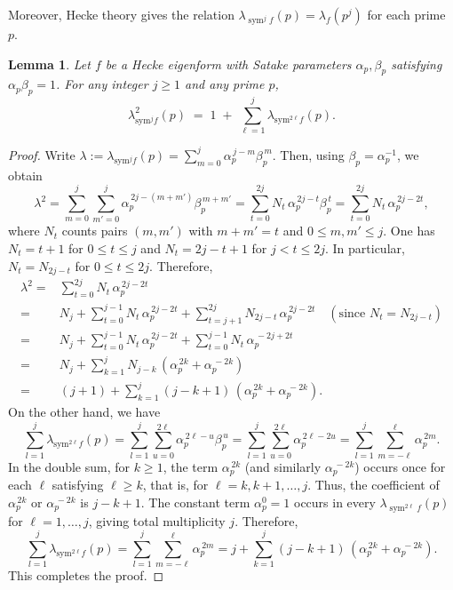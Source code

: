 \documentclass[10pt]{amsart}
\newtheorem{lemma}[theorem]{Lemma}
\begin{document}
Moreover, Hecke theory gives the relation $\lambda_{\operatorname{sym}^{j}f}(p) = \lambda_f(p^{j}) $ for each prime $p$.
\begin{lemma}\label{lambdasquare}
Let $f$ be a Hecke eigenform with Satake parameters $\alpha_p,\beta_p$ satisfying $\alpha_p\beta_p=1$.
For any integer $j \ge 1$ and any prime $p$,
\[
\lambda_{\mathrm{sym}^{j}f}^{2}(p) \;=\; 1 \;+\; \sum_{\ell=1}^{j} \lambda_{\mathrm{sym}^{2\ell}f}(p).\]
\end{lemma}
\begin{proof}
Write $\lambda := \lambda_{\mathrm{sym}^{j}f}(p) = \sum_{m=0}^{j} \alpha_p^{\,j-m}\beta_p^{\,m}$.
Then, using $\beta_p = \alpha_p^{-1}$, we obtain
\[
\lambda^{2} = \sum_{m=0}^{j}\sum_{m'=0}^{j} \alpha_p^{\,2j-(m+m')}\beta_p^{\,m+m'}
      = \sum_{t=0}^{2j} N_t \, \alpha_p^{\,2j-t}\beta_p^{\,t}= \sum_{t=0}^{2j} N_t \, \alpha_p^{\,2j-2t},
\]
where $N_t$ counts pairs $(m,m')$ with $m+m'=t$ and $0\le m,m'\le j$.
One has $N_t = t+1$ for $0\le t\le j$ and $N_t = 2j-t+1$ for $j<t\le 2j$. In particular, $N_t = N_{2j-t}$ for $0\le t\le 2j$. Therefore, 
\begin{align}
    \lambda^{2} = &\sum_{t=0}^{2j} N_t \, \alpha_p^{\,2j-2t}\\
      =&N_{j}+ \sum_{t=0}^{j-1} N_t \, \alpha_p^{\,2j-2t}+ \sum_{t=j+1}^{2j} N_{2j-t} \, \alpha_p^{\,2j-2t}\quad (\text{since } N_t = N_{2j-t})\\
      =&N_{j}+ \sum_{t=0}^{j-1} N_t \, \alpha_p^{\,2j-2t}+ \sum_{t=0}^{j-1} N_{t} \, \alpha_p^{\,-2j+2t}\\
      =&N_{j}+ \sum_{k=1}^{j} N_{j-k} \, \left(\alpha_p^{\,2k}+\alpha_p^{\,-2k}\right)\\
      =& (j+1)+ \sum_{k=1}^{j} (j-k+1) \, \left(\alpha_p^{\,2k}+\alpha_p^{\,-2k}\right).
\end{align}
On the other hand, we have
\[
\sum_{l=1}^{j}\lambda_{\mathrm{sym}^{2\ell}f}(p) = \sum_{l=1}^{j}\sum_{u=0}^{2\ell} \alpha_p^{\,2\ell-u}\beta_p^{\,u}= \sum_{l=1}^{j}\sum_{u=0}^{2\ell} \alpha_p^{\,2\ell-2u} = \sum_{l=1}^{j}\sum_{m=-\ell}^{\ell} \alpha_p^{\,2m}.
\]
In the double sum, for \( k \geq 1 \), the term \( \alpha_p^{\,2k} \) (and similarly \( \alpha_p^{\,-2k} \)) occurs once for each \( \ell \) satisfying \( \ell \ge k \), that is, for \( \ell = k, k+1, \dots, j \). Thus, the coefficient of \( \alpha_p^{\,2k} \) or \( \alpha_p^{\,-2k} \) is \( j-k+1 \).
The constant term $\alpha_p^{0}=1$ occurs in every $\lambda_{\operatorname{sym}^{2\ell} f}(p)$ for $\ell = 1, \dots, j$, giving total multiplicity $j$. Therefore,
\[
\sum_{l=1}^{j}\lambda_{\mathrm{sym}^{2\ell}f}(p) = \sum_{l=1}^{j}\sum_{m=-\ell}^{\ell} \alpha_p^{\,2m}=j+ \sum_{k=1}^{j} (j-k+1) \, \left(\alpha_p^{\,2k}+\alpha_p^{\,-2k}\right).
\]This completes the proof.
\end{proof}
\end{document}
